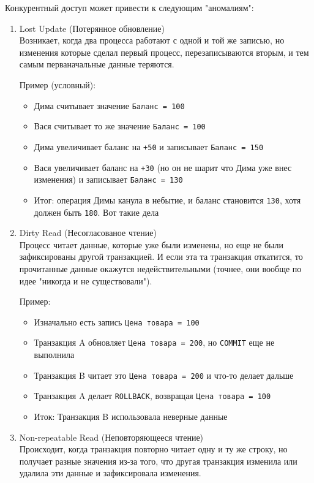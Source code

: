 Конкурентный доступ может привести к следующим "аномалиям":
\begin{enumerate}
    \item Lost Update (Потерянное обновление) ~\\
    Возникает, когда два процесса работают с одной и той же записью, но изменения которые сделал первый процесс, перезаписываются вторым, и тем самым перваначальные данные теряются.
    
    Пример (условный):
    \begin{itemize}
        \item Дима считывает значение \texttt{Баланс = 100}
        \item Вася считывает то же значение \texttt{Баланс = 100}
        \item Дима увеличивает баланс на \texttt{+50} и записывает \texttt{Баланс = 150}
        \item Вася увеличивает баланс на \texttt{+30} (но он не шарит что Дима уже внес изменения) и записывает \texttt{Баланс = 130}
        \item Итог: операция Димы канула в небытие, и баланс становится \texttt{130}, хотя должен быть \texttt{180}. Вот такие дела
    \end{itemize}

    \item Dirty Read (Несогласованое чтение) ~\\
    Процесс читает данные, которые уже были изменены, но еще не были зафиксированы другой транзакцией. И если эта та транзакция откатится, то прочитанные данные окажутся недействительными (точнее, они вообще по идее "никогда и не существовали").
    
    Пример:
    \begin{itemize}
        \item Изначально есть запись \texttt{Цена товара = 100}
        \item Транзакция A обновляет \texttt{Цена товара = 200}, но \texttt{COMMIT} еще не выполнила
        \item Транзакция B читает это \texttt{Цена товара = 200} и что-то делает дальше
        \item Транзакция A делает \texttt{ROLLBACK}, возвращая \texttt{Цена товара = 100}
        \item Иток: Транзакция B использовала неверные данные
    \end{itemize}

    \item Non-repeatable Read (Неповторяющееся чтение) ~\\
    Происходит, когда транзакция повторно читает одну и ту же строку, но получает разные значения из-за того, что другая транзакция изменила или удалила эти данные и зафиксировала изменения.


\end{enumerate}
